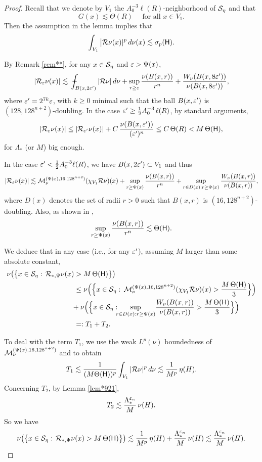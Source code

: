 \begin{proof}
Recall that we denote by $V_1$ the $A_0^{-3}\ell(R)$-neighborhood of ${\mathcal S}_\eta$
and that
$$G(x)\lesssim \Theta(R)\quad\mbox{ for all $x\in V_1$.}$$ 
Then the assumption in the lemma implies that
\begin{equation}\label{eqsig84}
\int_{V_1} \big|{\mathcal R}\nu(x)|^p\,d\nu(x) \lesssim \sigma_p({\mathsf{H}}).
\end{equation}

By Remark \ref{rem**}, for any $x\in {\mathcal S}_\eta$ and ${\varepsilon}>\Psi(x)$,
$$|\RR_\ve\nu(x)|\lesssim \avint_{B(x,2\ve')} |\RR\nu|\,d\nu + \sup_{r\geq \ve} \frac{\nu(B(x,r))}{r^n} + \frac{W_\nu(B(x,8\ve'))}{\nu(B(x,8\ve'))},$$
where ${\varepsilon}'=2^{7k}{\varepsilon}$, with $k\geq0$ minimal such that the ball $B(x,{\varepsilon}')$ is $(128,128^{n+2})$-doubling. 
In the case ${\varepsilon}'\geq \frac12 A_0^{-3}\,\ell(R)$, by standard arguments,
$$
|{\mathcal R}_{\varepsilon} \nu(x)|\leq |{\mathcal R}_{{\varepsilon}'} \nu(x)| + C\,\frac{\nu(B(x,{\varepsilon}'))}{({\varepsilon}')^n} \leq C\,
\Theta(R)< M\,\Theta({\mathsf{H}}),$$
for $\Lambda_*$ (or $M$) big enough.

In the case ${\varepsilon}'< \frac12 A_0^{-3}\ell(R)$, we have $B(x,2{\varepsilon}')\subset V_1$ and thus
$$|{\mathcal R}_{\varepsilon}\nu(x)|\lesssim {\mathcal M}_\nu^{(\Psi(x),16,128^{n+2})}(\chi_{V_1}{\mathcal R}\nu)(x) 
+ \sup_{r\geq \Psi(x)} \frac{\nu(B(x,r))}{r^n} + \sup_{r\in D(x):r\geq \Psi(x)} \\
 \frac{W_\nu(B(x,r))}{\nu(B(x,r))},
$$
where $D(x)$ denotes the set of radii $r>0$ such that $B(x,r)$ is $(16,128^{n+2})$-doubling.
Also, as shown in ,
$$\sup_{r\geq \Psi(x)} \frac{\nu(B(x,r))}{r^n} \lesssim \Theta({\mathsf{H}}).$$

We deduce that in any case (i.e., for any ${\varepsilon}'$), assuming $M$ larger than some absolute constant,
\begin{align*}
\nu\big(\big\{x\in {\mathcal S}_\eta:\,{\mathcal R}_{*,\Psi}\nu(x) &> M\,\Theta({\mathsf{H}})\big\}\big) \\& \leq
\nu\Big(\Big\{x\in {\mathcal S}_\eta:\,{\mathcal M}_\nu^{(\Psi(x),16,128^{n+2})}(\chi_{V_1}{\mathcal R}\nu)(x) > \frac{M\,\Theta({\mathsf{H}})}3\Big\}\Big)\\
& \!\!+
\nu\Big(\Big\{x\in {\mathcal S}_\eta:\!\!\!\sup_{r\in D(x):r\geq \Psi(x)} \!
 \frac{W_\nu(B(x,r))}{\nu(B(x,r))} > \frac{M\,\Theta({\mathsf{H}})}3\Big\}\Big)\\
 & =: T_1 + T_2.
\end{align*}

To deal with the term $T_1$, we use the weak $L^p(\nu)$ boundedness of ${\mathcal M}_\nu^{(\Psi(x),16,128^{n+2})}$ and  to obtain
$$T_1\lesssim \frac1{(M\Theta({\mathsf{H}}))^p} \int_{V_1}|{\mathcal R}\nu|^p\,d\nu
\lesssim \frac1{M^p}\,\eta(H).
$$
Concerning $T_2$, by Lemma \ref{lem*921},
$$T_2 \lesssim \frac{\Lambda_*^{{\varepsilon}_n}}{M} \,\nu(H).$$
So we have
$$\nu\big(\big\{x\in {\mathcal S}_\eta:\,{\mathcal R}_{*,\Psi}\nu(x) > M\,\Theta({\mathsf{H}})\big\}\big)\lesssim 
\frac1{M^p}\,\eta(H) + \frac{\Lambda_*^{{\varepsilon}_n}}{M} \,\nu(H)\lesssim \frac{\Lambda_*^{{\varepsilon}_n}}{M} \,\nu(H).$$
\end{proof}
\vv



